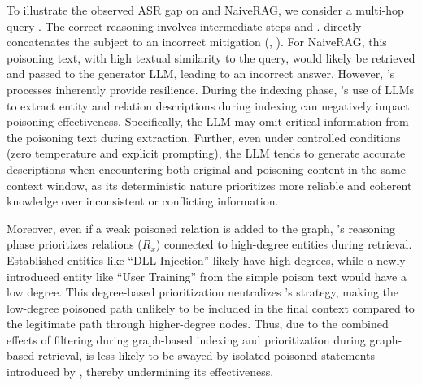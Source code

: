 To illustrate the observed ASR  gap on \rag and NaiveRAG, we consider a multi-hop query . The correct reasoning involves intermediate steps  and . \prag directly concatenates the subject to an incorrect mitigation (\meg, ). For NaiveRAG, this poisoning text,  with high textual similarity to the query, would likely be retrieved and passed to the generator LLM,  leading to an incorrect answer. However, \rag's processes inherently provide resilience. During the indexing phase, \rag's use of LLMs to extract entity and relation descriptions during indexing can negatively impact poisoning effectiveness. Specifically, the LLM may omit critical information from the poisoning text during extraction. Further, even under controlled conditions (zero temperature and explicit prompting), the LLM tends to generate accurate descriptions when encountering both original and poisoning content in the same context window, as its deterministic nature prioritizes more reliable and coherent knowledge over inconsistent or conflicting information.



Moreover, even if a weak poisoned relation is added to the graph, \rag's reasoning phase prioritizes relations ($R_x$) connected to high-degree entities during retrieval. Established entities like ``DLL Injection'' likely have high degrees, while a newly introduced entity like ``User Training'' from the simple poison text would have a low degree. This degree-based prioritization neutralizes \prag's strategy, making the low-degree poisoned path unlikely to be included in the final context compared to the legitimate path through higher-degree nodes. Thus, due to the combined effects of filtering during graph-based indexing and prioritization during graph-based retrieval, \rag is less likely to be swayed by isolated poisoned statements introduced by \prag, thereby undermining its effectiveness.

